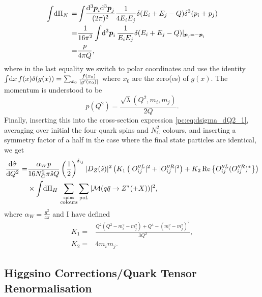 \documentclass[../main.tex]{subfiles}
\begin{document}
\begin{align}
  \int \!\mathrm{d}\Pi_N\, = & \int\! \frac{\mathrm{d}^3\boldsymbol{p}_i \mathrm{d}^3\boldsymbol{p}_j}{(2\pi)^2} \frac{1}{4E_i E_j} \delta(E_i+E_j-Q) \delta^3(p_i+p_j) \\
  =                  & \frac{1}{16\pi^2} \int \!\mathrm{d}^3\boldsymbol{p}_i\, \frac{1}{E_i E_j} \delta(E_i + E_j - Q)|_{\boldsymbol{p}_j = -\boldsymbol{p}_i}                 \\
  =                  & \frac{p}{4\pi Q},
\end{align}
where in the last equality we switch to polar coordinates and use the identity \(\int \!\mathrm{d}x\, f(x) \delta(g(x)) = \sum_{x_0} \frac{f(x_0)}{|g^\prime(x_0)|}\) where \(x_0\) are the zero(es) of \(g(x)\).
The momentum is understood to be
\begin{equation}
  p(Q^2) = \frac{\sqrt{\lambda}(Q^2, m_i, m_j)}{2Q}.
\end{equation}
Finally, inserting this into the cross-section expression \cref{pc:eq:dsigma_dQ2_1}, averaging over initial the four quark spins and \(N_C^2\) colours, and inserting a symmetry factor of a half in the case where the final state particles are identical, we get
\begin{align}
  \label{pc:eq:dsigma_dQ2_2}
  \nonumber
  \d[Q^2]{\hat\sigma} = & \frac{\alpha_W p}{16 N_C^2 \pi \hat{s} Q} \pclosed{\frac{1}{2}}^{\delta_{ij}} |D_Z(\hat{s})|^2 \pclosed{K_1\pclosed{|O_{ij}^{\prime\prime L}|^2+|O_{ij}^{\prime\prime R}|^2} + K_2 \Re{O_{ij}^{\prime\prime L} (O_{ij}^{\prime\prime R})^\ast}} \\
                        & \times \integral{\Pi_H} \sum_{\stackrel{\text{spins}}{\text{colours}}} \sum_\text{pol.}|\M(q\bar{q} \to Z^\ast (+ X))|^2,
\end{align}
where \(\alpha_W = \frac{g^2}{4\pi}\) and I have defined
\begin{subequations}
  \begin{align}
    K_1 = & \frac{Q^2(Q^2-m_i^2-m_j^2) + Q^4 - (m_i^2-m_j^2)^2}{3Q^2}, \\
    K_2 = & 4m_i m_j.
  \end{align}
\end{subequations}


\subsection{Higgsino Corrections/Quark Tensor Renormalisation}
\end{document}
